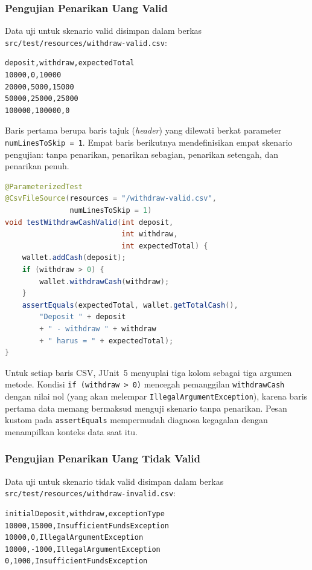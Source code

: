 \documentclass[12pt,a4paper]{article}
\begin{document}
\subsubsection{Pengujian Penarikan Uang Valid}

Data uji untuk skenario valid disimpan dalam berkas
\texttt{src/test/resources/withdraw-valid.csv}:

\begin{lstlisting}[caption={Isi berkas \texttt{withdraw-valid.csv}}]
deposit,withdraw,expectedTotal
10000,0,10000
20000,5000,15000
50000,25000,25000
100000,100000,0
\end{lstlisting}

Baris pertama berupa baris tajuk (\textit{header}) yang dilewati berkat parameter
\texttt{numLinesToSkip = 1}.  Empat baris berikutnya mendefinisikan empat skenario
pengujian: tanpa penarikan, penarikan sebagian, penarikan setengah, dan penarikan penuh.

\begin{lstlisting}[language=Java, caption={Pengujian penarikan valid dengan \texttt{@CsvFileSource}}]
@ParameterizedTest
@CsvFileSource(resources = "/withdraw-valid.csv",
               numLinesToSkip = 1)
void testWithdrawCashValid(int deposit,
                           int withdraw,
                           int expectedTotal) {
    wallet.addCash(deposit);
    if (withdraw > 0) {
        wallet.withdrawCash(withdraw);
    }
    assertEquals(expectedTotal, wallet.getTotalCash(),
        "Deposit " + deposit
        + " - withdraw " + withdraw
        + " harus = " + expectedTotal);
}
\end{lstlisting}

Untuk setiap baris CSV, JUnit~5 menyuplai tiga kolom sebagai tiga argumen metode.
Kondisi \texttt{if (withdraw > 0)} mencegah pemanggilan \texttt{withdrawCash} dengan
nilai nol (yang akan melempar \texttt{IllegalArgumentException}), karena baris pertama
data memang bermaksud menguji skenario tanpa penarikan.  Pesan kustom pada
\texttt{assertEquals} mempermudah diagnosa kegagalan dengan menampilkan konteks data
saat itu.

\subsubsection{Pengujian Penarikan Uang Tidak Valid}

Data uji untuk skenario tidak valid disimpan dalam berkas
\texttt{src/test/resources/withdraw-invalid.csv}:

\begin{lstlisting}[caption={Isi berkas \texttt{withdraw-invalid.csv}}]
initialDeposit,withdraw,exceptionType
10000,15000,InsufficientFundsException
10000,0,IllegalArgumentException
10000,-1000,IllegalArgumentException
0,1000,InsufficientFundsException
\end{lstlisting}
\end{document}
